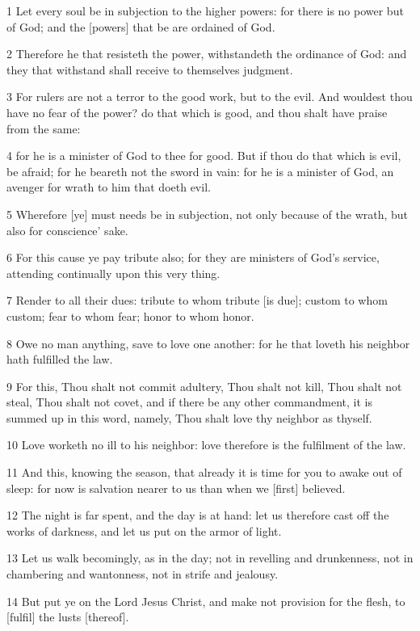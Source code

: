 \par 1 Let every soul be in subjection to the higher powers: for there is no power but of God; and the [powers] that be are ordained of God.
\par 2 Therefore he that resisteth the power, withstandeth the ordinance of God: and they that withstand shall receive to themselves judgment.
\par 3 For rulers are not a terror to the good work, but to the evil. And wouldest thou have no fear of the power? do that which is good, and thou shalt have praise from the same:
\par 4 for he is a minister of God to thee for good. But if thou do that which is evil, be afraid; for he beareth not the sword in vain: for he is a minister of God, an avenger for wrath to him that doeth evil.
\par 5 Wherefore [ye] must needs be in subjection, not only because of the wrath, but also for conscience' sake.
\par 6 For this cause ye pay tribute also; for they are ministers of God's service, attending continually upon this very thing.
\par 7 Render to all their dues: tribute to whom tribute [is due]; custom to whom custom; fear to whom fear; honor to whom honor.
\par 8 Owe no man anything, save to love one another: for he that loveth his neighbor hath fulfilled the law.
\par 9 For this, Thou shalt not commit adultery, Thou shalt not kill, Thou shalt not steal, Thou shalt not covet, and if there be any other commandment, it is summed up in this word, namely, Thou shalt love thy neighbor as thyself.
\par 10 Love worketh no ill to his neighbor: love therefore is the fulfilment of the law.
\par 11 And this, knowing the season, that already it is time for you to awake out of sleep: for now is salvation nearer to us than when we [first] believed.
\par 12 The night is far spent, and the day is at hand: let us therefore cast off the works of darkness, and let us put on the armor of light.
\par 13 Let us walk becomingly, as in the day; not in revelling and drunkenness, not in chambering and wantonness, not in strife and jealousy.
\par 14 But put ye on the Lord Jesus Christ, and make not provision for the flesh, to [fulfil] the lusts [thereof].

